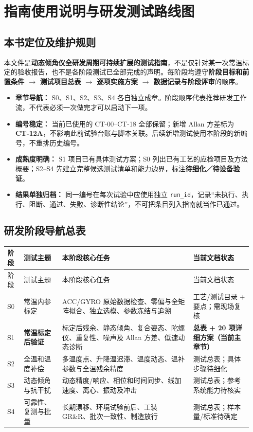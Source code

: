 \chapter{指南使用说明与研发测试路线图}
\section{本书定位及维护规则}
本文件是\textbf{动态倾角仪全研发周期可持续扩展的测试指南}，不是仅针对某一次常温标定的验收报告，也不是各阶段测试已全部完成的声明。每阶段均遵守\textbf{阶段目标和前置条件 $\rightarrow$ 测试项目总表 $\rightarrow$ 逐项实施方案 $\rightarrow$ 数据记录与阶段评审}的顺序。
\begin{itemize}
\item \textbf{章节导航：} S0、S1、S2、S3、S4 各自独立成章。阶段顺序代表推荐研发工作流，不代表必须一次做完才可以启动下一项。
\item \textbf{编号稳定：} 当前已使用的 CT-00--CT-18 全部保留；新增 Allan 方差标为 \textbf{CT-12A}，不影响此前试验台账与脚本关联。后续新增测试使用本阶段的新编号，不重排历史编号。
\item \textbf{成熟度明确：} S1 项目已有具体测试方案；S0 列出已有工艺的应检项目及方法概要；S2--S4 先建立完整候选测试清单和能力边界，标注\textbf{待细化／待设备验证}。
\item \textbf{结果单独归档：} 同一编号在每次试验中应使用独立 \texttt{run\_id}，记录“未执行、执行、阻断、通过、失败、诊断性结论”，不可把条目列入指南就当作已通过。
\end{itemize}
\section{研发阶段导航总表}
\small
\begin{longtable}{C{13mm}p{30mm}p{64mm}p{36mm}}
\toprule
阶段 & 测试主题 & 本阶段核心任务 & 当前文档状态\\\midrule\endfirsthead
\toprule 阶段 & 测试主题 & 本阶段核心任务 & 当前文档状态\\\midrule\endhead
S0 & 常温内参标定 & ACC/GYRO 原始数据检查、零偏与全矩阵拟合、独立选模、参数冻结与追溯 & 工艺/测试目录 + 要点；需现场复核\\
S1 & \textbf{常温标定后验证} & 标定后残余、静态倾角、复合姿态、陀螺仪、重复性、噪声及 Allan 方差、低速动态诊断 & \textbf{总表 + 20 项详细方案（当前主章节）}\\
S2 & 全温和温度补偿 & 多温度点、升降温迟滞、温度动态、温补参数与全温残余精度 & 测试总表；具体步骤待细化\\
S3 & 动态倾角与抗干扰 & 动态精度/响应、相位和时间同步、线加速度、离心、振动及冲击 & 测试总表；参考系统能力待核实\\
S4 & 可靠性、复测与批量 & 长期漂移、环境试验前后、工装 GR\&R、批次一致性、制造放行 & 测试总表；样本量/标准待确定\\\bottomrule
\end{longtable}
\normalsize
